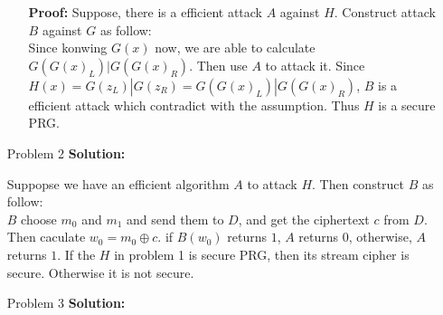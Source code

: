 \normalfont\documentclass[letterpaper,11pt]{article}
\begin{document}
\begin{enumerate}
\begin{enumerate}
			\textbf{Proof:}
			Suppose, there is a efficient attack $A$ against $H$. Construct attack $B$ against $G$ as follow:\\ Since konwing $G(x)$ now, we are able to calculate $G(G(x)_L)|G(G(x)_R)$. Then use $A$ to attack it. Since $H(x) = G(z_L)|G(z_R) = G(G(x)_L)|G(G(x)_R)$, $B$ is a efficient attack which contradict with the assumption. Thus $H$ is a secure PRG.
	\end{enumerate}
\item [Problem 2]\textbf{Solution:}\par
	Suppopse we have an efficient algorithm $A$ to attack $H$. Then construct $B$ as follow:\\
	$B$ choose $m_0$ and $m_1$ and send them to $D$, and get the ciphertext $c$ from $D$. Then caculate $w_0 = m_0 \oplus c$. if $B(w_0)$ returns $1$, $A$ returns $0$, otherwise, $A$ returns $1$.
	If the $H$ in problem 1 is secure PRG, then its stream cipher is secure. Otherwise it is not secure.
\item [Problem 3]\textbf{Solution:}\par

\end{enumerate}
\end{document}
